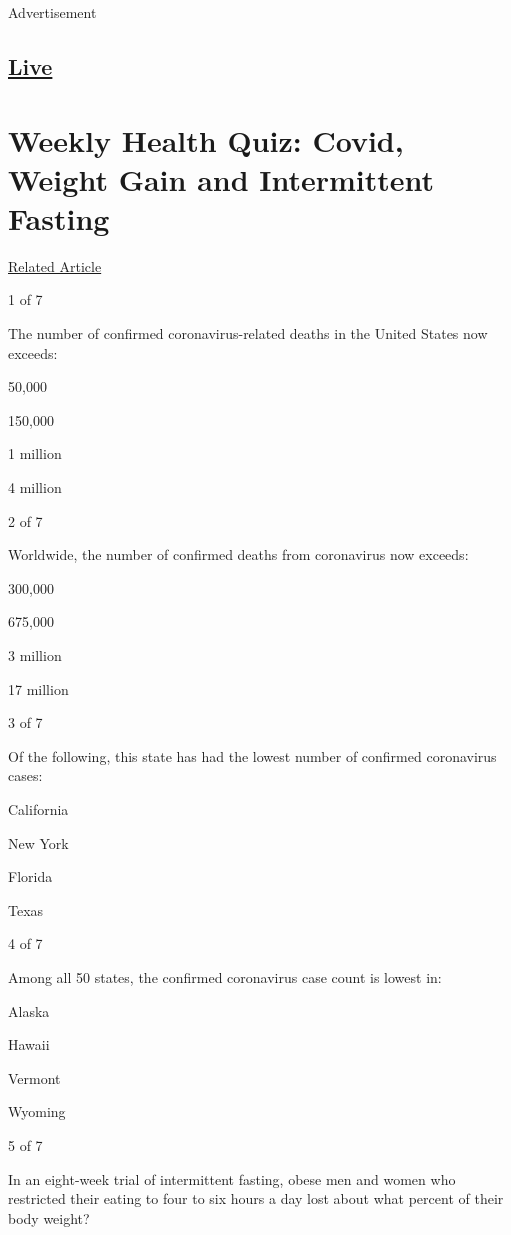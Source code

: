 Advertisement

\hypertarget{-live-}{%
\subsection{\texorpdfstring{
\href{https://www.nytimes3xbfgragh.onion/section/well/live}{Live}
}{ Live }}\label{-live-}}

\hypertarget{weekly-health-quiz-covid-weight-gain-and-intermittent-fasting}{%
\section{Weekly Health Quiz: Covid, Weight Gain and Intermittent
Fasting}\label{weekly-health-quiz-covid-weight-gain-and-intermittent-fasting}}

\href{https://www.nytimes3xbfgragh.onion/interactive/2020/07/24/well/live/24healthquiz-07242020.html}{Related
Article}

1 of 7

The number of confirmed coronavirus-related deaths in the United States
now exceeds:

50,000

150,000

1 million

4 million

2 of 7

Worldwide, the number of confirmed deaths from coronavirus now exceeds:

300,000

675,000

3 million

17 million

3 of 7

Of the following, this state has had the lowest number of confirmed
coronavirus cases:

California

New York

Florida

Texas

4 of 7

Among all 50 states, the confirmed coronavirus case count is lowest in:

Alaska

Hawaii

Vermont

Wyoming

5 of 7

In an eight-week trial of intermittent fasting, obese men and women who
restricted their eating to four to six hours a day lost about what
percent of their body weight?

